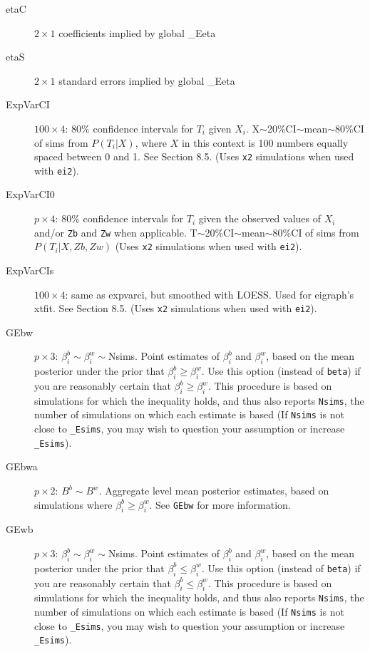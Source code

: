 \documentclass[11pt,titlepage]{article}
\begin{document}
\begin{description}
\item[etaC] $2\times 1$ coefficients implied by global \_Eeta

\item[etaS] $2\times 1$ standard errors implied by global \_Eeta
  
\item[ExpVarCI] $100\times 4$: 80\% confidence intervals for $T_i$
  given $X_i$.  X$\sim$20\%CI$\sim$mean$\sim$80\%CI of sims from
  $P(T_i|X)$, where $X$ in this context is 100 numbers equally spaced
  between 0 and 1.  See Section 8.5.  (Uses \texttt{x2} simulations
  when used with \texttt{ei2}).
  
\item[ExpVarCI0] $p\times 4$: 80\% confidence intervals for $T_i$
  given the observed values of $X_i$ and/or \texttt{Zb} and
  \texttt{Zw} when applicable.  T$\sim$20\%CI$\sim$mean$\sim$80\%CI of
  sims from $P(T_i|X, Zb, Zw)$ (Uses \texttt{x2} simulations
  when used with \texttt{ei2}).
  
\item[ExpVarCIs] $100\times 4$: same as expvarci, but smoothed with
  LOESS.  Used for eigraph's xtfit.  See Section 8.5.  (Uses
  \texttt{x2} simulations when used with \texttt{ei2}).

\item[GEbw] $p\times 3$: $\beta_i^b\sim\beta_i^w\sim$Nsims.  Point
  estimates of $\beta_i^b$ and $\beta_i^w$, based on the mean
  posterior under the prior that $\beta_i^b\geq\beta_i^w$.  Use this
  option (instead of \texttt{beta}) if you are reasonably certain that
  $\beta_i^b\geq\beta_i^w$.  This procedure is based on simulations for
  which the inequality holds, and thus also reports \texttt{Nsims},
  the number of simulations on which each estimate is based (If
  \texttt{Nsims} is not close to \texttt{\_Esims}, you may wish to
  question your assumption or increase \texttt{\_Esims}).
  
\item[GEbwa] $p\times 2$: $B^b\sim B^w$.  Aggregate level mean
  posterior estimates, based on simulations where
  $\beta_i^b\geq\beta_i^w$.  See \texttt{GEbw} for more information.

\item[GEwb] $p\times 3$: $\beta_i^b\sim\beta_i^w\sim$Nsims.  Point
  estimates of $\beta_i^b$ and $\beta_i^w$, based on the mean
  posterior under the prior that $\beta_i^b\leq\beta_i^w$.  Use this
  option (instead of \texttt{beta}) if you are reasonably certain that
  $\beta_i^b\leq\beta_i^w$.  This procedure is based on simulations for
  which the inequality holds, and thus also reports \texttt{Nsims},
  the number of simulations on which each estimate is based (If
  \texttt{Nsims} is not close to \texttt{\_Esims}, you may wish to
  question your assumption or increase \texttt{\_Esims}).
  

\end{description}
\end{document}
